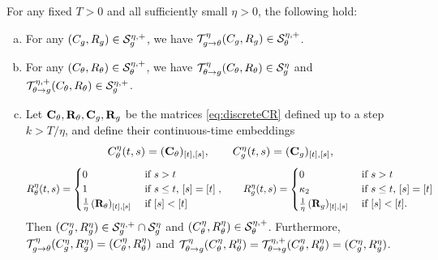 \begin{lemma}\label{lemma:discretemappings}
For any fixed $T>0$ and all sufficiently small $\eta>0$, the following hold:
\begin{enumerate}[(a)]
\item For any $(C_g,R_g) \in \mathcal{S}_g^{\eta,+}$, we have $\mathcal{T}_{g \to
\theta}^\eta(C_g,R_g) \in \mathcal{S}_\theta^{\eta,+}$.
\item For any $(C_\theta,R_\theta) \in \mathcal{S}_\theta^{\eta,+}$, we have $\mathcal{T}_{\theta
\to g}^\eta(C_\theta,R_\theta) \in \mathcal{S}_g^\eta$
and $\mathcal{T}_{\theta \to g}^{\eta,+}(C_\theta,R_\theta) \in \mathcal{S}_g^{\eta,+}$.
\item Let $\mathbf{C}_\theta,\mathbf{R}_\theta,\mathbf{C}_g,\mathbf{R}_g$ be the matrices
\eqref{eq:discreteCR} defined up to a step
$k>T/\eta$, and define their continuous-time embeddings
\[C_\theta^\eta(t,s)=(\mathbf{C}_\theta)_{[t],[s]},
\qquad C_g^\eta(t,s)=(\mathbf{C}_g)_{[t],[s]},\]
\[R_\theta^\eta(t,s)=\begin{cases}
0 & \text{ if } s>t\\
1 & \text{ if } s \leq t,\,[s]=[t] \\
\frac{1}{\eta}\,(\mathbf{R}_\theta)_{[t],[s]} & \text{ if } [s]<[t]
\end{cases},
\qquad R_g^\eta(t,s)=\begin{cases}
0 & \text{ if } s>t\\
\kappa_2 & \text{ if } s \leq t,\,[s]=[t] \\
\frac{1}{\eta}\,(\mathbf{R}_g)_{[t],[s]} & \text{ if } [s]<[t].
\end{cases}
\]
Then $(C_g^\eta,R_g^\eta) \in \mathcal{S}_g^{\eta,+} \cap \mathcal{S}_g^\eta$ and
$(C_\theta^\eta,R_\theta^\eta) \in \mathcal{S}_\theta^{\eta,+}$. Furthermore,
$\mathcal{T}_{g \to \theta}^\eta(C_g^\eta,R_g^\eta)=(C_\theta^\eta,R_\theta^\eta)$
and $\mathcal{T}_{\theta \to g}^\eta(C_\theta^\eta,R_\theta^\eta)=
\mathcal{T}_{\theta \to g}^{\eta,+}(C_\theta^\eta,R_\theta^\eta)=(C_g^\eta,R_g^\eta)$.
\end{enumerate}
\end{lemma}
